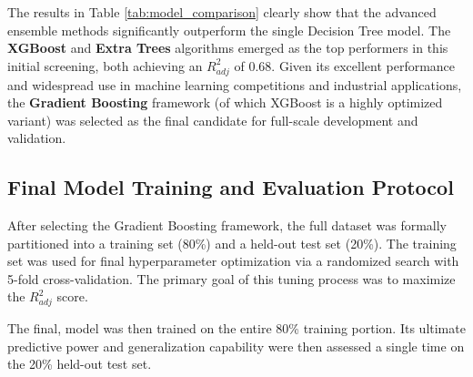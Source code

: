 The results in Table \ref{tab:model_comparison} clearly show that the advanced ensemble methods significantly outperform the single Decision Tree model. The \textbf{XGBoost} and \textbf{Extra Trees} algorithms emerged as the top performers in this initial screening, both achieving an \(R^2_{adj}\) of 0.68. Given its excellent performance and widespread use in machine learning competitions and industrial applications, the \textbf{Gradient Boosting} framework (of which XGBoost is a highly optimized variant) was selected as the final candidate for full-scale development and validation.

\subsection{Final Model Training and Evaluation Protocol}

After selecting the Gradient Boosting framework, the full dataset was formally partitioned into a training set (80\%) and a held-out test set (20\%). The training set was used for final hyperparameter optimization via a randomized search with 5-fold cross-validation. The primary goal of this tuning process was to maximize the \(R^2_{adj}\) score.

The final, model was then trained on the entire 80\% training portion. Its ultimate predictive power and generalization capability were then assessed a single time on the 20\% held-out test set.